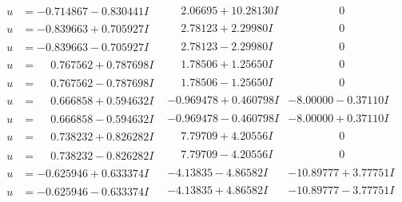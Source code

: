 \documentclass[1p]{elsarticle_modified}
\theoremstyle{definition}
\begin{document}
$$\begin{array}{c|c|c}
\begin{aligned}
u &= -0.714867 - 0.830441 I\end{aligned}
 & \phantom{-}2.06695 + 10.28130 I & \phantom{-0.000000 } 0 \\ \hline\begin{aligned}
u &= -0.839663 + 0.705927 I\end{aligned}
 & \phantom{-}2.78123 + 2.29980 I & \phantom{-0.000000 } 0 \\ \hline\begin{aligned}
u &= -0.839663 - 0.705927 I\end{aligned}
 & \phantom{-}2.78123 - 2.29980 I & \phantom{-0.000000 } 0 \\ \hline\begin{aligned}
u &= \phantom{-}0.767562 + 0.787698 I\end{aligned}
 & \phantom{-}1.78506 + 1.25650 I & \phantom{-0.000000 } 0 \\ \hline\begin{aligned}
u &= \phantom{-}0.767562 - 0.787698 I\end{aligned}
 & \phantom{-}1.78506 - 1.25650 I & \phantom{-0.000000 } 0 \\ \hline\begin{aligned}
u &= \phantom{-}0.666858 + 0.594632 I\end{aligned}
 & -0.969478 + 0.460798 I & -8.00000 - 0.37110 I \\ \hline\begin{aligned}
u &= \phantom{-}0.666858 - 0.594632 I\end{aligned}
 & -0.969478 - 0.460798 I & -8.00000 + 0.37110 I \\ \hline\begin{aligned}
u &= \phantom{-}0.738232 + 0.826282 I\end{aligned}
 & \phantom{-}7.79709 + 4.20556 I & \phantom{-0.000000 } 0 \\ \hline\begin{aligned}
u &= \phantom{-}0.738232 - 0.826282 I\end{aligned}
 & \phantom{-}7.79709 - 4.20556 I & \phantom{-0.000000 } 0 \\ \hline\begin{aligned}
u &= -0.625946 + 0.633374 I\end{aligned}
 & -4.13835 - 4.86582 I & -10.89777 + 3.77751 I \\ \hline\begin{aligned}
u &= -0.625946 - 0.633374 I\end{aligned}
 & -4.13835 + 4.86582 I & -10.89777 - 3.77751 I \\ \hline\begin{aligned}

\end{aligned}
\end{array}$$
\end{document}
